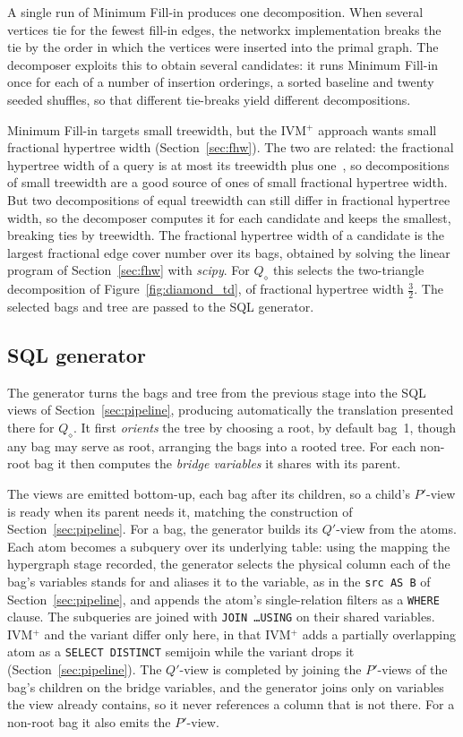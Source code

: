 A single run of Minimum Fill-in produces one decomposition.
When several vertices tie for the fewest fill-in edges, the networkx implementation breaks the tie by the order in which the vertices were inserted into the primal graph.
The decomposer exploits this to obtain several candidates: it runs Minimum Fill-in once for each of a number of insertion orderings, a sorted baseline and twenty seeded shuffles, so that different tie-breaks yield different decompositions.

Minimum Fill-in targets small treewidth, but the IVM$^+$ approach wants small fractional hypertree width (Section~\ref{sec:fhw}).
The two are related: the fractional hypertree width of a query is at most its treewidth plus one~\cite{grohe2014}, so decompositions of small treewidth are a good source of ones of small fractional hypertree width.
But two decompositions of equal treewidth can still differ in fractional hypertree width, so the decomposer computes it for each candidate and keeps the smallest, breaking ties by treewidth.
The fractional hypertree width of a candidate is the largest fractional edge cover number over its bags, obtained by solving the linear program of Section~\ref{sec:fhw} with \emph{scipy}.
For $Q_\diamond$ this selects the two-triangle decomposition of Figure~\ref{fig:diamond_td}, of fractional hypertree width $\tfrac{3}{2}$.
The selected bags and tree are passed to the SQL generator.

\subsection{SQL generator}

The generator turns the bags and tree from the previous stage into the SQL views of Section~\ref{sec:pipeline}, producing automatically the translation presented there for $Q_\diamond$.
It first \emph{orients} the tree by choosing a root, by default bag~1, though any bag may serve as root, arranging the bags into a rooted tree.
For each non-root bag it then computes the \emph{bridge variables} it shares with its parent.

The views are emitted bottom-up, each bag after its children, so a child's $P'$-view is ready when its parent needs it, matching the construction of Section~\ref{sec:pipeline}.
For a bag, the generator builds its $Q'$-view from the atoms.
Each atom becomes a subquery over its underlying table: using the mapping the hypergraph stage recorded, the generator selects the physical column each of the bag's variables stands for and aliases it to the variable, as in the \texttt{src AS B} of Section~\ref{sec:pipeline}, and appends the atom's single-relation filters as a \texttt{WHERE} clause.
The subqueries are joined with \texttt{JOIN \ldots USING} on their shared variables.
IVM$^+$ and the variant differ only here, in that IVM$^+$ adds a partially overlapping atom as a \texttt{SELECT DISTINCT} semijoin while the variant drops it (Section~\ref{sec:pipeline}).
The $Q'$-view is completed by joining the $P'$-views of the bag's children on the bridge variables, and the generator joins only on variables the view already contains, so it never references a column that is not there.
For a non-root bag it also emits the $P'$-view.

